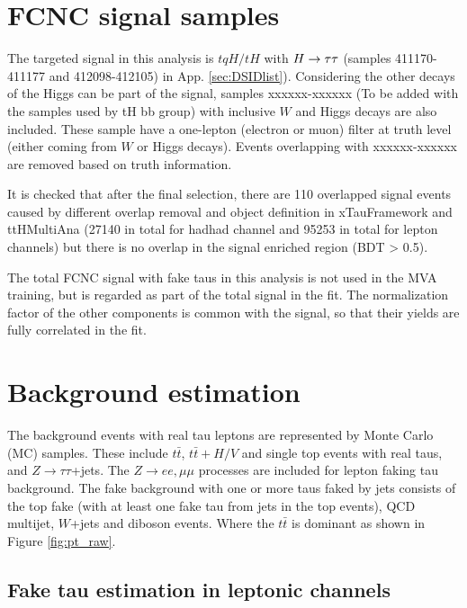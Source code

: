 \section{FCNC signal samples}
\label{sec:fcncbkg}

The targeted signal in this analysis is $tqH/tH$ with $H \rightarrow \tau\tau$ (samples 411170-411177 and 412098-412105) in App. \ref{sec:DSIDlist}).
Considering the other decays of the Higgs can be part of the signal, samples xxxxxx-xxxxxx (To be added with the samples used by tH bb group) with inclusive $W$ and Higgs decays are also included. These sample have a one-lepton (electron or muon) filter at truth level (either coming from $W$ or Higgs decays). Events overlapping with xxxxxx-xxxxxx are removed based on truth information.

It is checked that after the final selection, there are 110 overlapped signal events caused by different overlap removal and object definition in xTauFramework and ttHMultiAna (27140 in total for hadhad channel and 95253 in total for lepton channels) but there is no overlap in the signal enriched region (BDT > 0.5).

The total FCNC signal with fake taus in this analysis is not used in the MVA training, but is regarded as part of the total signal in the fit. The normalization factor of the other components is common with the signal, so that their yields are fully correlated in the fit.

\section{Background estimation}
\label{sec:background}

The background events with real tau leptons are represented by Monte Carlo (MC) samples. These include $t\bar{t}$, $t\bar{t}+H/V$ and 
single top events with real taus, and $Z\to\tau\tau$+jets. The $Z\to ee,\mu\mu$ processes are included for lepton faking 
tau background.
The fake background with one or more taus faked by jets consists of the top fake (with at least one fake tau from jets in the top events), 
QCD multijet, $W$+jets and diboson events. Where the $t\bar t$ is dominant as shown in Figure \ref{fig:pt_raw}.



\subsection{Fake tau estimation in leptonic channels}
\label{sec:sf_method}

